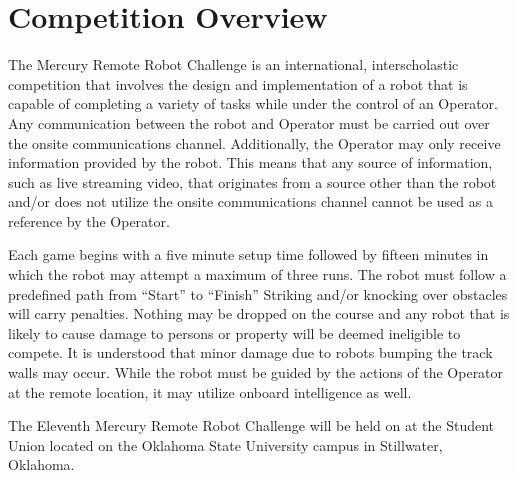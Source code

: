 \section{Competition Overview}
The Mercury Remote Robot Challenge is an international, interscholastic competition that involves the design and implementation of a robot that is capable of completing a variety of tasks while under the control of an Operator. Any communication between the robot and Operator must be carried out over the onsite communications channel. Additionally, the Operator may only receive information provided by the robot. This means that any source of information, such as live streaming video, that originates from a source other than the robot and/or does not utilize the onsite communications channel cannot be used as a reference by the Operator.

Each game begins with a five minute setup time followed by fifteen minutes in which the robot may attempt a maximum of three runs. The robot must follow a predefined path from “Start” to “Finish”  Striking and/or knocking over obstacles will carry penalties. Nothing may be dropped on the course and any robot that is likely to cause damage to persons or property will be deemed ineligible to compete. It is understood that minor damage due to robots bumping the track walls may occur. While the robot must be guided by the actions of the Operator at the remote location, it may utilize onboard intelligence as well.

The Eleventh Mercury Remote Robot Challenge will be held on \textbf{\competition} at the Student Union located on the Oklahoma State University campus in Stillwater, Oklahoma.